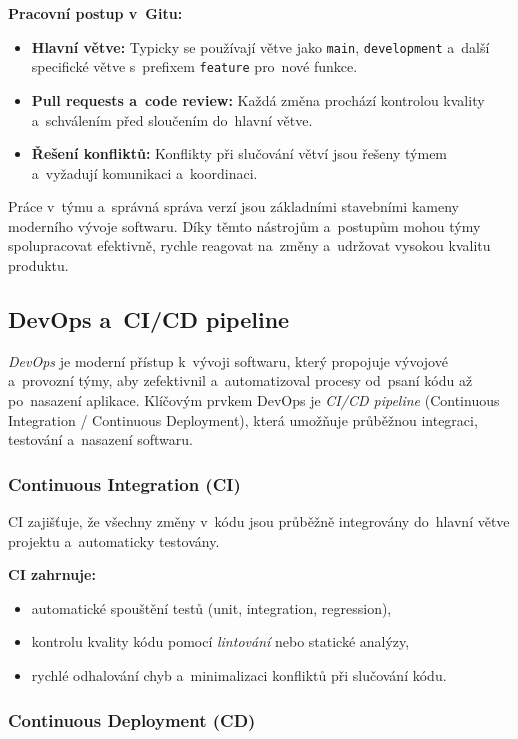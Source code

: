 \documentclass[male,czech,api_bc]{kitheses}
\begin{document}
\textbf{Pracovní postup v~Gitu:}
\begin{itemize}
	\item \textbf{Hlavní větve:} Typicky se používají větve jako \texttt{main}, \texttt{development} a~další specifické větve s~prefixem \texttt{feature} pro~nové funkce.
	\item \textbf{Pull requests a~code review:} Každá změna prochází kontrolou kvality a~schválením před sloučením do~hlavní větve.
	\item \textbf{Řešení konfliktů:} Konflikty při slučování větví jsou řešeny týmem a~vyžadují komunikaci a~koordinaci.
\end{itemize}

Práce v~týmu a~správná správa verzí jsou základními stavebními kameny moderního vývoje softwaru. Díky těmto nástrojům a~postupům mohou týmy spolupracovat efektivně, rychle reagovat na~změny a~udržovat vysokou kvalitu produktu.

\subsection{DevOps a~CI/CD pipeline}

\textit{DevOps} je moderní přístup k~vývoji softwaru, který propojuje vývojové a~provozní týmy, aby zefektivnil a~automatizoval procesy od~psaní kódu až po~nasazení aplikace. Klíčovým prvkem DevOps je \textit{CI/CD pipeline} (Continuous Integration / Continuous Deployment), která umožňuje průběžnou integraci, testování a~nasazení softwaru.

\subsubsection{Continuous Integration (CI)}

CI zajišťuje, že všechny změny v~kódu jsou průběžně integrovány do~hlavní větve projektu a~automaticky testovány.

\textbf{CI zahrnuje:}
\begin{itemize}
	\item automatické spouštění testů (unit, integration, regression),
	\item kontrolu kvality kódu pomocí \textit{lintování} nebo statické analýzy,
	\item rychlé odhalování chyb a~minimalizaci konfliktů při slučování kódu.
\end{itemize}

\subsubsection{Continuous Deployment (CD)}
\end{document}
